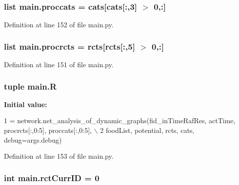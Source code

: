 \hypertarget{a00151_a4e3c4b627d098aef6c7905cb20683e07}{
\subsubsection[{proccats}]{\setlength{\rightskip}{0pt plus 5cm}list main.\-proccats = {\bf cats}\mbox{[}{\bf cats}\mbox{[}\-:,3\mbox{]} $>$ 0,\-:\mbox{]}}}\label{a00151_a4e3c4b627d098aef6c7905cb20683e07}


Definition at line 152 of file main.\-py.

\hypertarget{a00151_a2120e8355b3501aed0114a74091d56c1}{
\subsubsection[{procrcts}]{\setlength{\rightskip}{0pt plus 5cm}list main.\-procrcts = {\bf rcts}\mbox{[}{\bf rcts}\mbox{[}\-:,5\mbox{]} $>$ 0,\-:\mbox{]}}}\label{a00151_a2120e8355b3501aed0114a74091d56c1}


Definition at line 151 of file main.\-py.

\hypertarget{a00151_a8a594014e054956af345eaa5e16bea0d}{
\subsubsection[{R}]{\setlength{\rightskip}{0pt plus 5cm}tuple main.\-R}}\label{a00151_a8a594014e054956af345eaa5e16bea0d}
{\bfseries Initial value\-:}
\begin{DoxyCode}
1 = network.net\_analysis\_of\_dynamic\_graphs(fid\_inTimeRafRes, actTime, procrcts[:,0:5], proccats[:,0:5], \(\backslash\)
2                                                                                                                                                 
         foodList, potential, rcts, cats, debug=args.debug)
\end{DoxyCode}


Definition at line 153 of file main.\-py.

\hypertarget{a00151_a53e397dea15f17442a198395e65b377b}{
\subsubsection[{rct\-Curr\-I\-D}]{\setlength{\rightskip}{0pt plus 5cm}int main.\-rct\-Curr\-I\-D = 0}}\label{a00151_a53e397dea15f17442a198395e65b377b}


